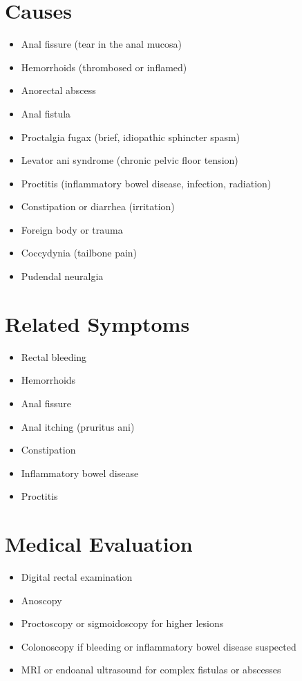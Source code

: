 \section*{Causes}
\begin{itemize}
\item Anal fissure (tear in the anal mucosa)
\item Hemorrhoids (thrombosed or inflamed)
\item Anorectal abscess
\item Anal fistula
\item Proctalgia fugax (brief, idiopathic sphincter spasm)
\item Levator ani syndrome (chronic pelvic floor tension)
\item Proctitis (inflammatory bowel disease, infection, radiation)
\item Constipation or diarrhea (irritation)
\item Foreign body or trauma
\item Coccydynia (tailbone pain)
\item Pudendal neuralgia
\end{itemize}

\section*{Related Symptoms}
\begin{itemize}
\item Rectal bleeding
\item Hemorrhoids
\item Anal fissure
\item Anal itching (pruritus ani)
\item Constipation
\item Inflammatory bowel disease
\item Proctitis
\end{itemize}

\section*{Medical Evaluation}
\begin{itemize}
\item Digital rectal examination
\item Anoscopy
\item Proctoscopy or sigmoidoscopy for higher lesions
\item Colonoscopy if bleeding or inflammatory bowel disease suspected
\item MRI or endoanal ultrasound for complex fistulas or abscesses
\end{itemize}

